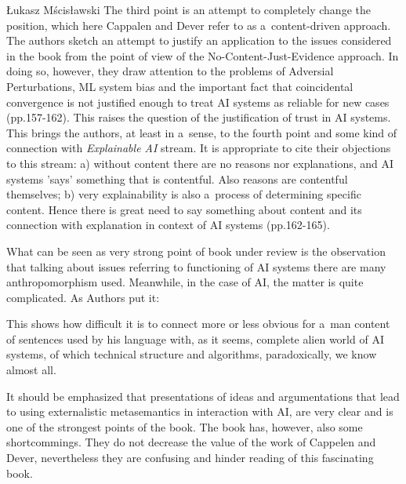 \begin{newrevengenv}{Łukasz Mścisławski}
The third point is an attempt to completely change the position, which here Cappalen and Dever refer to as a~content-driven approach. The authors sketch an attempt to justify an application to the issues considered in the book from the point of view of the No-Content-Just-Evidence approach. In doing so, however, they draw attention to the problems of Adversial Perturbations, ML system bias and the important fact that coincidental convergence is not justified enough to treat AI systems as reliable for new cases (pp.157-162). This raises the question of the justification of trust in AI systems. This brings the authors, at least in a~sense, to the fourth point and some kind of connection with \textit{Explainable AI} stream. It is appropriate to cite their objections to this stream: a) without content there are no reasons nor explanations, and AI systems 'says' something that is contentful. Also reasons are contentful themselves; b) very explainability is also a~process of determining specific content. Hence there is great need to say something about content and its connection with explanation in context of AI systems (pp.162-165).

What can be seen as very strong point of book under review is the observation that talking about issues referring to functioning of AI systems there are many anthropomorphism used. Meanwhile, in the case of AI, the matter is quite complicated. As Authors put it:

This shows how difficult it is to connect more or less obvious for a~man content of sentences used by his language with, as it seems, complete alien world of AI systems, of which technical structure and algorithms, paradoxically, we know almost all.

It should be emphasized that presentations of ideas and argumentations that lead to using externalistic metasemantics in interaction with AI, are very clear and is one of the strongest points of the book. The book has, however, also some shortcommings. They do not decrease the value of the work of Cappelen and Dever, nevertheless they are confusing and hinder reading of this fascinating book.


\end{newrevengenv}

